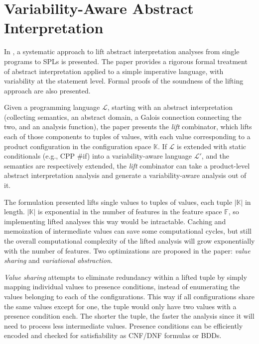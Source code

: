 \documentclass[11pt]{article}
\begin{document}
\section{Variability-Aware Abstract Interpretation}

\newcommand{\configSpace}{\mathbb{K}}
\newcommand{\featSpace}{\mathbb{F}}
\newcommand{\lang}{\mathcal{L}}

In \cite{Midtgaard:2015}, a systematic approach to lift abstract interpretation analyses from single programs to SPLs is presented. The paper provides a rigorous  formal treatment of abstract interpretation applied to a simple imperative language, with variability at the statement level. Formal proofs of the soundness of the lifting approach are also presented. 

Given a programming language $\lang$, starting with an abstract interpretation (collecting semantics, an abstract domain, a Galois connection connecting the two, and an analysis function), the paper presents the \emph{lift} combinator, which lifts each of those components to tuples of values, with each value corresponding to a product configuration in the configuration space $\configSpace$. If $\lang$ is extended with static conditionals (e.g., CPP \#if) into a variability-aware language  $\lang'$, and the semantics are respectively extended, the \emph{lift} combinator can take a product-level abstract interpretation analysis and generate a variability-aware analysis out of it. 

The formulation presented lifts single values to tuples of values, each tuple $|\configSpace|$ in length. $|\configSpace|$ is exponential in the number of features in the feature space $\featSpace$, so implementing lifted analyses this way would be intractable. Caching and memoization of intermediate values can save some computational cycles, but still the overall computational complexity of the lifted analysis will grow exponentially with the number of features. Two optimizations are proposed in the paper: \emph{value sharing} and \emph{variational abstraction}.

\emph{Value sharing} attempts to eliminate redundancy within a lifted tuple by simply mapping individual values to presence conditions, instead of enumerating the values belonging to each of the configurations. This way if all configurations share the same values except for one, the tuple would only have two values with a presence condition each. The shorter the tuple, the faster the analysis since it will need to process less intermediate values. Presence conditions can be efficiently encoded and checked for satisfiability as CNF/DNF formulas or BDDs.
\end{document}
